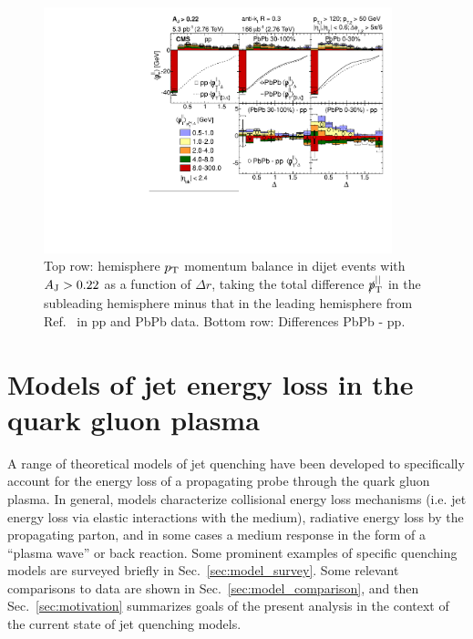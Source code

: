 \begin{figure}[hbtp]
\begin{center}
\includegraphics[width=0.9\textwidth]{figures/Theory/MpT_Unbalanced.pdf}
\caption[Radial distribution of hemisphere momentum balance as a function of $\Delta r$ for unbalanced dijets]{Top row: hemisphere $p_{\rm T}$ momentum balance in dijet events with $A_{\rm J} > 0.22$ as a function of $\Delta r$, taking the total difference $\slashed{p}_{\rm T}^{\rm ||}$ in the subleading hemisphere minus that in the leading hemisphere from Ref.~\cite{HIN_2014_010} in pp and PbPb data.  Bottom row:  Differences PbPb - pp.}
\label{fig:cms_mpT_unbalanced}
\end{center}
\end{figure}




\clearpage


\section{Models of jet energy loss in the quark gluon plasma}
\label{sec:theory_models}

A range of theoretical models of jet quenching have been developed to specifically account for the energy loss of a propagating probe through the quark gluon plasma.  In general, models characterize collisional energy loss mechanisms (i.e. jet energy loss via elastic interactions with the medium), radiative energy loss by the propagating parton, and in some cases a medium response in the form of a ``plasma wave'' or back reaction.  Some prominent examples of specific quenching models are surveyed briefly in Sec.~\ref{sec:model_survey}.  Some relevant comparisons to data are shown in Sec.~\ref{sec:model_comparison}, and then Sec.~\ref{sec:motivation} summarizes goals of the present analysis in the context of the current state of jet quenching models. 

